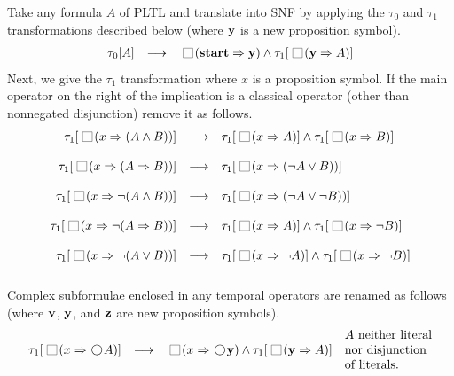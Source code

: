 \documentclass[nohyperref]{acmtrans2f}
\newcommand{\always}{\raisebox{-.2ex}{
                           \mbox{\unitlength=0.9ex
                           \begin{picture}(2,2)
                           \linethickness{0.06ex}
                           \put(0,0){\line(1,0){2}}
                           \put(0,2){\line(1,0){2}}
                           \put(0,0){\line(0,1){2}}
                           \put(2,0){\line(0,1){2}}
                           \end{picture}}}
                          \,}
\newcommand{\next}{\!\raisebox{-.2ex}{ %
                        \mbox{\unitlength=0.9ex
                        \begin{picture}(2,2)
                        \linethickness{0.06ex}
                        \put(1,1){\circle{2}} %
                        \end{picture}}}       %
                        \,}
\let\imp=\Rightarrow
\let\iff=\Leftrightarrow
\def\lstart{\hbox{\rm\bf start}}
\begin{document}
Take any formula $A$ of PLTL and translate into SNF by applying the
$\tau_0$ and $\tau_1$ transformations described below
(where ${\bf y}$ is a new proposition symbol).
$$
\begin{array}{rcl}
\tau_0[A] & \longrightarrow  &
\always(\lstart  \imp  {\bf y}) \land \tau_1[\always({\bf y}  \imp  A)]
\end{array}
$$
%
Next, we give the $\tau_1$ transformation where $x$ is a proposition symbol.
If the main operator on the right of the implication is a classical
operator (other than nonnegated disjunction) remove it as follows. 
$$
\begin{array}{rcl}
\tau_1[\always(x \imp (A \land B))] & \longrightarrow  &
\tau_1[\always(x  \imp  A)] \land 
\tau_1[\always(x  \imp  B)]\\
\\
\tau_1[\always(x \imp (A \imp B))]
 & \longrightarrow  &
\tau_1[\always(x  \imp  (\neg A \lor B))]\\
\\
\tau_1[\always(x \imp \neg (A \land B))]
 & \longrightarrow  &
\tau_1[\always(x  \imp  (\neg A \lor \neg B))]\\
\\
\tau_1[\always(x \imp \neg (A \imp B))]
 & \longrightarrow  &
\tau_1[\always(x  \imp  A)] \land 
\tau_1[\always(x  \imp  \neg B)]\\
\\
\tau_1[\always(x \imp \neg (A \lor B))]
 & \longrightarrow  &
\tau_1[\always(x  \imp  \neg A)] \land
\tau_1[\always(x  \imp  \neg B)]\\
\\
\end{array}
$$
%
%
Complex subformulae enclosed in any temporal operators are renamed as
follows (where ${\bf v}$, ${\bf y}$, and ${\bf z}$ are new proposition symbols).
$$
\begin{array}{rcll}
&&&\mbox{$A$ neither literal}\\
\tau_1[\always(x \imp \next A )]
 & \longrightarrow  &
\always(x  \imp  \next {\bf y}) \land
\tau_1[\always({\bf y}  \imp  A)]
&
\mbox{nor disjunction}\\
&&&\mbox{of literals.}\\
\end{array}
$$
\end{document}
